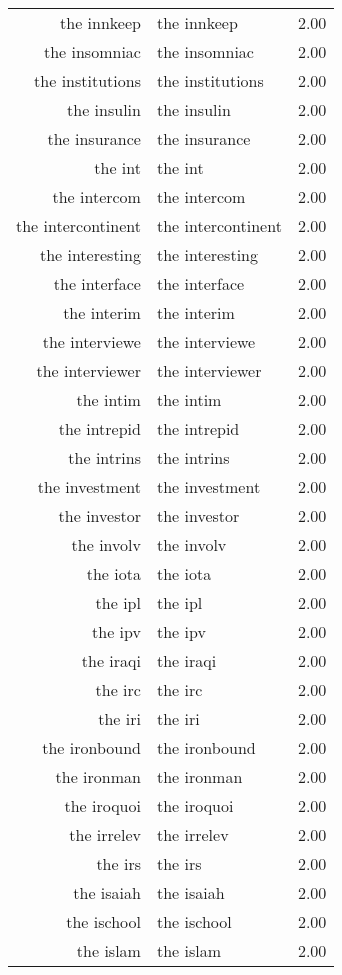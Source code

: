 \begin{table}[ht]
\begin{tabular}{rlr}
  the innkeep & the innkeep & 2.00 \\ 
  the insomniac & the insomniac & 2.00 \\ 
  the institutions & the institutions & 2.00 \\ 
  the insulin & the insulin & 2.00 \\ 
  the insurance & the insurance & 2.00 \\ 
  the int & the int & 2.00 \\ 
  the intercom & the intercom & 2.00 \\ 
  the intercontinent & the intercontinent & 2.00 \\ 
  the interesting & the interesting & 2.00 \\ 
  the interface & the interface & 2.00 \\ 
  the interim & the interim & 2.00 \\ 
  the interviewe & the interviewe & 2.00 \\ 
  the interviewer & the interviewer & 2.00 \\ 
  the intim & the intim & 2.00 \\ 
  the intrepid & the intrepid & 2.00 \\ 
  the intrins & the intrins & 2.00 \\ 
  the investment & the investment & 2.00 \\ 
  the investor & the investor & 2.00 \\ 
  the involv & the involv & 2.00 \\ 
  the iota & the iota & 2.00 \\ 
  the ipl & the ipl & 2.00 \\ 
  the ipv & the ipv & 2.00 \\ 
  the iraqi & the iraqi & 2.00 \\ 
  the irc & the irc & 2.00 \\ 
  the iri & the iri & 2.00 \\ 
  the ironbound & the ironbound & 2.00 \\ 
  the ironman & the ironman & 2.00 \\ 
  the iroquoi & the iroquoi & 2.00 \\ 
  the irrelev & the irrelev & 2.00 \\ 
  the irs & the irs & 2.00 \\ 
  the isaiah & the isaiah & 2.00 \\ 
  the ischool & the ischool & 2.00 \\ 
  the islam & the islam & 2.00 \\ 

\end{tabular}
\end{table}

